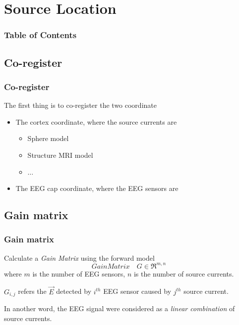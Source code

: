 \documentclass{beamer}
\begin{document}
\section{Source Location}

\begin{frame}
    \frametitle{Table of Contents}
\end{frame}

\subsection{Co-register}
\begin{frame}
    \frametitle{Co-register}
    The first thing is to co-register the two coordinate
    \begin{itemize}
        \item The cortex coordinate, where the source currents are
        \begin{itemize}
            \item Sphere model
            \item Structure MRI model
            \item $\dots$
        \end{itemize}
        \item The EEG cap coordinate, where the EEG sensors are
    \end{itemize}
\end{frame}

\subsection{Gain matrix}
\begin{frame}
    \frametitle{Gain matrix}
    Calculate a \emph{Gain Matrix} using the forward model
    \begin{equation}
        Gain Matrix \quad G \in \mathfrak{R}^{m, n}
    \end{equation}
    where $m$ is the number of EEG sensors, $n$ is the number of source currents.

    $G_{i, j}$ refers the $\vec{E}$ detected by $i^{th}$ EEG sensor caused by $j^{th}$ source current.

    In another word, the EEG signal were considered as a \emph{linear combination} of source currents.
\end{frame}
\end{document}
